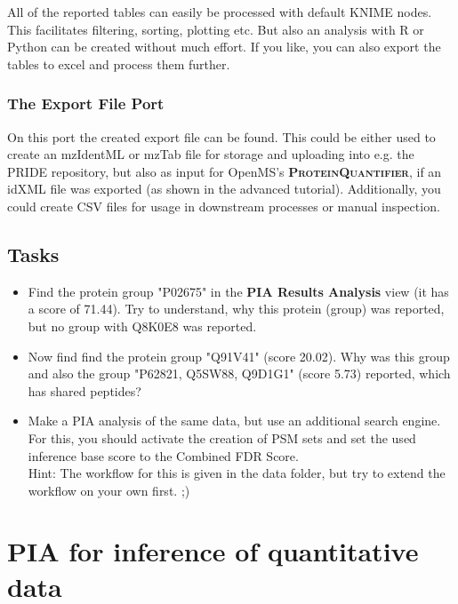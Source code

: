 \documentclass[a4paper,11pt,twoside]{article}
\newcommand{\knimenode}[1]{{\scshape\bfseries #1}}
\begin{document}
All of the reported tables can easily be processed with default KNIME nodes.
This facilitates filtering, sorting, plotting etc. But also an analysis with R
or Python can be created without much effort. If you like, you can also export
the tables to excel and process them further.


\subsubsection{The Export File Port}

On this port the created export file can be found. This could be either used
to create an mzIdentML or mzTab file for storage and uploading into e.g. the
PRIDE repository, but also as input for OpenMS's \knimenode{ProteinQuantifier},
if an idXML file was exported (as shown in the advanced tutorial).
Additionally, you could create CSV files for usage in downstream processes or
manual inspection.


\subsection{Tasks}

\begin{itemize}
	\item Find the protein group "P02675" in the \textbf{PIA Results Analysis}
	view (it has a score of 71.44). Try to understand, why this protein (group)
	was reported, but no group with Q8K0E8 was reported.

	\item Now find find the protein group "Q91V41" (score 20.02). Why
	was this group and also the group "P62821, Q5SW88, Q9D1G1" (score 5.73)
	reported, which has shared peptides?

	\item Make a PIA analysis of the same data, but use an additional search
	engine. For this, you should activate the creation of PSM sets and set the
	used inference base score to the Combined FDR Score.\\
	Hint: The workflow for this is given in the data folder, but try to extend the
	workflow on your own first. ;)
\end{itemize}



\newpage
\section{PIA for inference of quantitative data}
\end{document}
